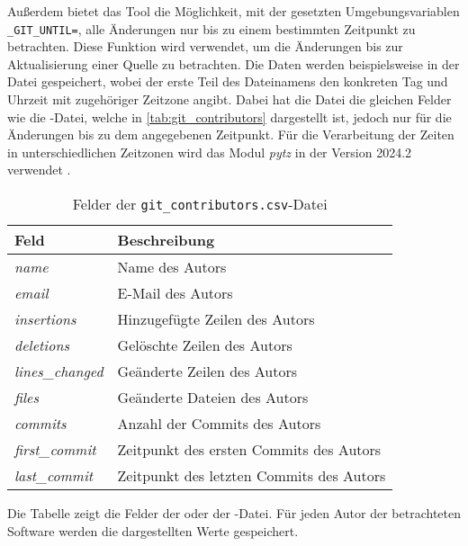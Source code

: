 Außerdem bietet das Tool die Möglichkeit, mit der gesetzten Umgebungsvariablen \texttt{\_GIT\_UNTIL=}, alle Änderungen nur bis zu einem bestimmten Zeitpunkt zu betrachten.
Diese Funktion wird verwendet, um die Änderungen bis zur Aktualisierung einer Quelle zu betrachten.
Die Daten werden beispielsweise in der Datei  gespeichert, wobei der erste Teil des Dateinamens den konkreten Tag und Uhrzeit mit zugehöriger Zeitzone angibt.
Dabei hat die Datei die gleichen Felder wie die -Datei, welche in \autoref{tab:git_contributors} dargestellt ist, jedoch nur für die Änderungen bis zu dem angegebenen Zeitpunkt.
Für die Verarbeitung der Zeiten in unterschiedlichen Zeitzonen wird das Modul \emph{pytz} in der Version 2024.2 verwendet \autocite{bishop_pytz_2024}.

\begin{table}
    \begin{tabularx}{\textwidth}{XL{10.2cm}}
        \toprule
        \textbf{Feld}         & \textbf{Beschreibung}                   \\ \midrule
        \emph{name}           & Name des Autors                         \\
        \emph{email}          & E-Mail des Autors                       \\
        \emph{insertions}     & Hinzugefügte Zeilen des Autors          \\
        \emph{deletions}      & Gelöschte Zeilen des Autors             \\
        \emph{lines\_changed} & Geänderte Zeilen des Autors             \\
        \emph{files}          & Geänderte Dateien des Autors            \\
        \emph{commits}        & Anzahl der Commits des Autors           \\
        \emph{first\_commit}  & Zeitpunkt des ersten Commits des Autors \\
        \emph{last\_commit}  & Zeitpunkt des letzten Commits des Autors \\
        \bottomrule
    \end{tabularx}
    \caption{Felder der \texttt{git\_contributors.csv}-Datei}
    \label{tab:git_contributors}
    \small
    Die Tabelle zeigt die Felder der  oder der -Datei. Für jeden Autor der betrachteten Software werden die dargestellten Werte gespeichert.
\end{table}
